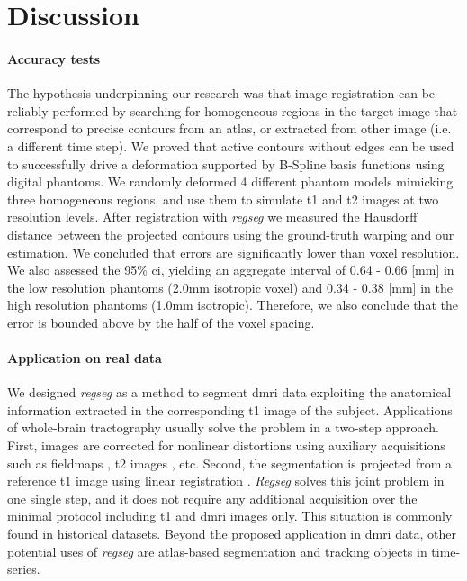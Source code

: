 \section{Discussion}
\label{sec:discussion}

\paragraph*{Accuracy tests}
The hypothesis underpinning our research was that image registration can be reliably performed
  by searching for homogeneous regions in the target image that correspond to precise contours
  from an atlas, or extracted from other image (i.e. a different time step).
We proved that active contours without edges can be used to successfully drive a
  deformation supported by B-Spline basis functions using digital phantoms.
We randomly deformed 4 different phantom models mimicking three homogeneous regions,
  and use them to simulate \gls*{t1} and \gls*{t2} images at two resolution levels.
After registration with \emph{regseg} we measured the Hausdorff distance between the
  projected contours using the ground-truth warping and our estimation.
We concluded that errors are significantly lower than voxel resolution.
We also assessed the 95\% \gls*{ci}, yielding an aggregate interval of
  0.64 - 0.66 [mm] in the low resolution phantoms (2.0mm isotropic voxel) and
  0.34 - 0.38 [mm] in the high resolution phantoms (1.0mm isotropic).
Therefore, we also conclude that the error is bounded above by the half of the
  voxel spacing.

\paragraph*{Application on real data}
We designed \emph{regseg} as a method to segment \gls*{dmri} data exploiting the
  anatomical information extracted in the corresponding \gls*{t1} image of the subject.
Applications of whole-brain tractography \citep{smith_tractbased_2006,craddock_imaging_2013}
  usually solve the problem in a two-step approach.
First, images are corrected for nonlinear distortions using auxiliary acquisitions
  such as fieldmaps \citep{jezzard_correction_1995}, \gls*{t2} images \citep{kybic_unwarping_2000},
  etc.
Second, the segmentation is projected from a reference \gls*{t1} image using linear
  registration \citep{greve_accurate_2009}.
\emph{Regseg} solves this joint problem in one single step, and it does not require any additional
  acquisition over the minimal protocol including \gls*{t1} and \gls*{dmri} images only.
This situation is commonly found in historical datasets.
Beyond the proposed application in \gls*{dmri} data, other potential uses of \emph{regseg} are
  atlas-based segmentation and tracking objects in time-series.


